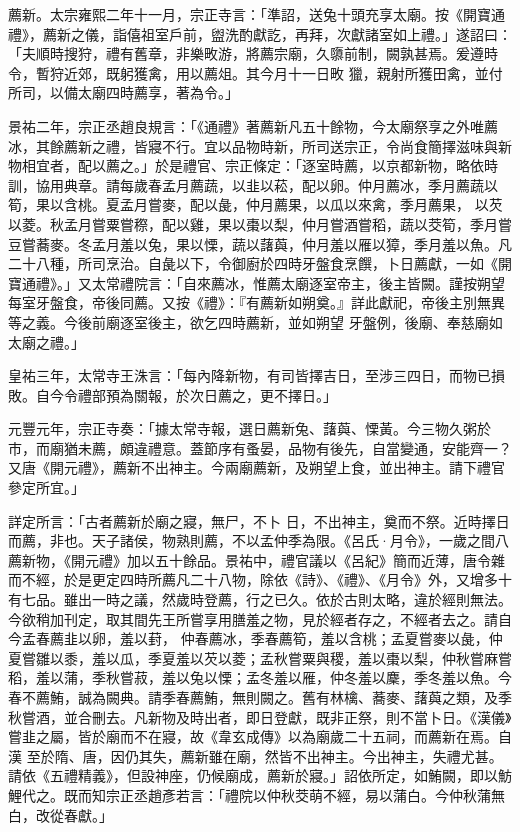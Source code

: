 \begin{pinyinscope}
 薦新。太宗雍熙二年十一月，宗正寺言：「準詔，送兔十頭充享太廟。按《開寶通禮》，薦新之儀，詣僖祖室戶前，盥洗酌獻訖，再拜，次獻諸室如上禮。」遂詔曰：「夫順時搜狩，禮有舊章，非樂畋游，將薦宗廟，久隳前制，闕孰甚焉。爰遵時令，暫狩近郊，既躬獲禽，用以薦俎。其今月十一日畋
 獵，親射所獲田禽，並付所司，以備太廟四時薦享，著為令。」



 景祐二年，宗正丞趙良規言：「《通禮》著薦新凡五十餘物，今太廟祭享之外唯薦冰，其餘薦新之禮，皆寢不行。宜以品物時新，所司送宗正，令尚食簡擇滋味與新物相宜者，配以薦之。」於是禮官、宗正條定：「逐室時薦，以京都新物，略依時訓，協用典章。請每歲春孟月薦蔬，以韭以菘，配以卵。仲月薦冰，季月薦蔬以筍，果以含桃。夏孟月嘗麥，配以彘，仲月薦果，以瓜以來禽，季月薦果，
 以芡以菱。秋孟月嘗粟嘗穄，配以雞，果以棗以梨，仲月嘗酒嘗稻，蔬以茭筍，季月嘗豆嘗蕎麥。冬孟月羞以兔，果以慄，蔬以藷藇，仲月羞以雁以獐，季月羞以魚。凡二十八種，所司烹治。自彘以下，令御廚於四時牙盤食烹饌，卜日薦獻，一如《開寶通禮》。」又太常禮院言：「自來薦冰，惟薦太廟逐室帝主，後主皆闕。謹按朔望每室牙盤食，帝後同薦。又按《禮》：『有薦新如朔奠。』詳此獻祀，帝後主別無異等之義。今後前廟逐室後主，欲乞四時薦新，並如朔望
 牙盤例，後廟、奉慈廟如太廟之禮。」



 皇祐三年，太常寺王洙言：「每內降新物，有司皆擇吉日，至涉三四日，而物已損敗。自今令禮部預為關報，於次日薦之，更不擇日。」



 元豐元年，宗正寺奏：「據太常寺報，選日薦新兔、藷藇、慄黃。今三物久粥於市，而廟猶未薦，頗違禮意。蓋節序有蚤晏，品物有後先，自當變通，安能齊一？又唐《開元禮》，薦新不出神主。今兩廟薦新，及朔望上食，並出神主。請下禮官參定所宜。」



 詳定所言：「古者薦新於廟之寢，無尸，不卜
 日，不出神主，奠而不祭。近時擇日而薦，非也。天子諸侯，物熟則薦，不以孟仲季為限。《呂氏·月令》，一歲之間八薦新物，《開元禮》加以五十餘品。景祐中，禮官議以《呂紀》簡而近薄，唐令雜而不經，於是更定四時所薦凡二十八物，除依《詩》、《禮》、《月令》外，又增多十有七品。雖出一時之議，然歲時登薦，行之已久。依於古則太略，違於經則無法。今欲稍加刊定，取其間先王所嘗享用膳羞之物，見於經者存之，不經者去之。請自今孟春薦韭以卵，羞以葑，
 仲春薦冰，季春薦筍，羞以含桃；孟夏嘗麥以彘，仲夏嘗雛以黍，羞以瓜，季夏羞以芡以菱；孟秋嘗粟與稷，羞以棗以梨，仲秋嘗麻嘗稻，羞以蒲，季秋嘗菽，羞以兔以慄；孟冬羞以雁，仲冬羞以麇，季冬羞以魚。今春不薦鮪，誠為闕典。請季春薦鮪，無則闕之。舊有林檎、蕎麥、藷藇之類，及季秋嘗酒，並合刪去。凡新物及時出者，即日登獻，既非正祭，則不當卜日。《漢儀》嘗韭之屬，皆於廟而不在寢，故《韋玄成傳》以為廟歲二十五祠，而薦新在焉。自漢
 至於隋、唐，因仍其失，薦新雖在廟，然皆不出神主。今出神主，失禮尤甚。請依《五禮精義》，但設神座，仍候廟成，薦新於寢。」詔依所定，如鮪闕，即以魴鯉代之。既而知宗正丞趙彥若言：「禮院以仲秋茭萌不經，易以蒲白。今仲秋蒲無白，改從春獻。」




\end{pinyinscope}
